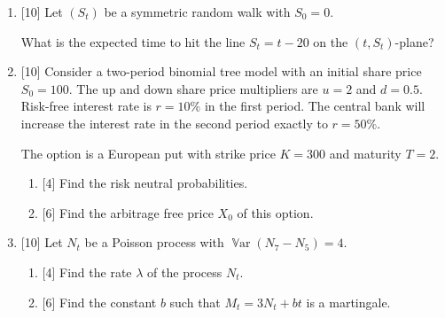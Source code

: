 \documentclass[12pt]{article}
\DeclareMathOperator{\Var}{\mathbb{V}ar}
\begin{document}
\begin{enumerate}
 
    \item {[10]} Let $(S_t)$ be a symmetric random walk with $S_0 = 0$. 
    
    What is the expected time to hit the line $S_t = t - 20$ on the $(t, S_t)$-plane?

 

    \item {[10]} Consider a two-period binomial tree model with an initial share price $S_0 = 100$. 
    The up and down share price multipliers are $u = 2$ and $d = 0.5$. 
    Risk-free interest rate is $r = 10\%$ in the first period. 
    The central bank will increase the interest rate in the second period exactly to $r = 50\%$.

    The option is a European put with strike price $K = 300$ and maturity $T = 2$. 
    
    \begin{enumerate}
        \item {[4]} Find the risk neutral probabilities.
        \item {[6]} Find the arbitrage free price $X_0$ of this option.
    \end{enumerate}

    \item {[10]} Let $N_t$ be a Poisson process with $\Var(N_7 - N_5) = 4$.
    \begin{enumerate}
      \item {[4]} Find the rate $\lambda$ of the process $N_t$. 
      \item {[6]} Find the constant $b$ such that $M_t = 3N_t + bt$ is a martingale.
    \end{enumerate}


\end{enumerate}
\end{document}

